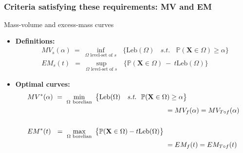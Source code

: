 \documentclass[10pt]{beamer}
\newcommand{\st}{\text{\emph{s.t.}}{}}
\def\mb{\mathbf}
\def\leb{\text{Leb}}
\begin{document}
\begin{frame}
\frametitle{Criteria satisfying these requirements: MV and EM}

\begin{block}{Mass-volume and excess-mass curves}
\begin{itemize}
\item \textbf{Definitions:}
\begin{align*}
& MV_s(\alpha) ~=~ \inf_{\Omega \text{ level-set of } s}~~~ \big\{\leb(\Omega) ~~~~s.t.~~~~ \mathbb{P}(\mb X \in \Omega) \ge \alpha\big\} \\
& EM_s(t) ~~=~ \sup_{\Omega \text{ level-set of } s}~~~\big\{ \mathbb{P}(\mb X \in \Omega) ~-~ t \leb(\Omega) \big\}
\end{align*}


\item \textbf{Optimal curves:}
\begin{align*}
&MV^*(\alpha) ~=~ \min_{\Omega~ \text{borelian}} ~\big\{\leb(\Omega) ~~~\st~~ \mathbb{P}(\mb X \in \Omega) \ge \alpha\big\}\\
&~~~~~~~~~~~~~~~~~~~~~~~~~~~~~~~~~~~~~~~~~~~~~~~~~~~~~~~~~~~~~= MV_f(\alpha) = MV_{T \circ f}(\alpha)\\~\\
&EM^*(t) ~~=~ \max_{\Omega\text{ borelian} } ~\big\{{\mathbb{P}} (\mb X\in \Omega)-t\leb(\Omega) \big\}\\
&~~~~~~~~~~~~~~~~~~~~~~~~~~~~~~~~~~~~~~~~~~~~~~~~~~~~~~~~~~~~~= EM_f(t) = EM_{T \circ f}(t)
\end{align*}

\end{itemize}
\end{block}
\end{frame}
\end{document}

